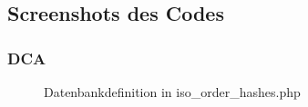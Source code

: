 \subsection{Screenshots des Codes}
\label{ScreenhotsCode}

\subsubsection{DCA}
\label{app:ScreenshotDca}
\begin{figure}[htb]
\centering
{}
\caption{Datenbankdefinition in iso\_order\_hashes.php}
\end{figure}
\clearpage
